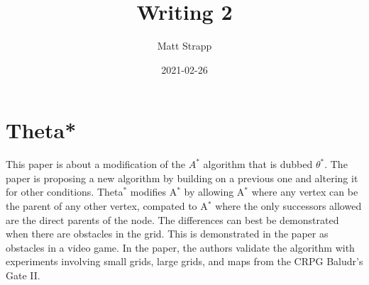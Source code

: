 \documentclass{article}
\title{Writing 2}
\author{Matt Strapp}
\date{2021-02-26}
\begin{document}
   \maketitle
   \section*{Theta*}
   This paper is about a modification of the $A^{\ast}$ algorithm that is dubbed $\theta^{\ast}$.
   The paper is proposing a new algorithm by building on a previous one and altering it for other conditions.
   Theta$^{\ast}$ modifies A$^{\ast}$ by allowing A$^{\ast}$ where any vertex can be the parent of any other vertex, compated to A$^{\ast}$ where the only successors allowed are the direct parents of the node.
   The differences can best be demonstrated when there are obstacles in the grid. This is demonstrated in the paper as obstacles in a video game.
   In the paper, the authors validate the algorithm with experiments involving small grids, large grids, and maps from the CRPG Baludr's Gate II.
   
\end{document}
